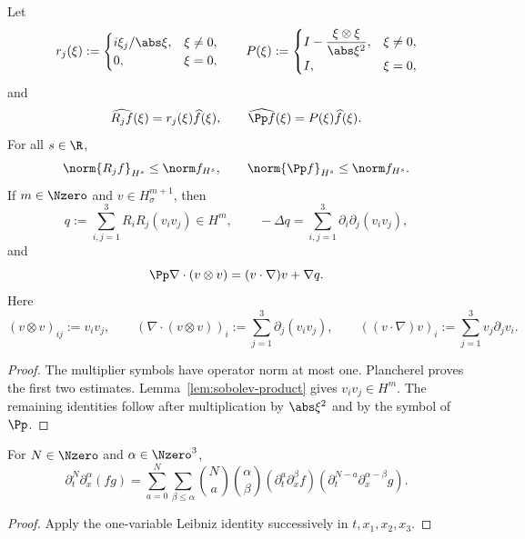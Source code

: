 \begin{lemma}
\label{lem:riesz-leray}
Let
\[
 r_j(\xi):=
 \begin{cases}
 i\xi_j/\abs\xi,&\xi\ne0,\\
 0,&\xi=0,
 \end{cases}
 \qquad
 P(\xi):=
 \begin{cases}
 I-\dfrac{\xi\otimes\xi}{\abs\xi^2},&\xi\ne0,\\
 I,&\xi=0,
 \end{cases}
\]
and
\[
 \widehat{R_jf}(\xi)=r_j(\xi)\widehat f(\xi),
 \qquad
 \widehat{\Pp f}(\xi)=P(\xi)\widehat f(\xi).
\]
For all \(s\in\R\),
\[
 \norm{R_jf}_{H^s}\le\norm f_{H^s},
 \qquad
 \norm{\Pp f}_{H^s}\le\norm f_{H^s}.
\]
If \(m\in\Nzero\) and \(v\in H^{m+1}_\sigma\), then
\[
 q:=\sum_{i,j=1}^3R_iR_j(v_iv_j)\in H^m,
 \qquad
 -\Delta q=\sum_{i,j=1}^3\partial_i\partial_j(v_iv_j),
\]
and
\[
 \Pp\nabla\cdot(v\otimes v)
 =(v\cdot\nabla)v+\nabla q.
\]
Here
\[
 (v\otimes v)_{ij}:=v_iv_j,
 \qquad
 (\nabla\cdot(v\otimes v))_i
 :=\sum_{j=1}^3\partial_j(v_iv_j),
 \qquad
 ((v\cdot\nabla)v)_i:=\sum_{j=1}^3v_j\partial_jv_i.
\]
\end{lemma}

\begin{proof}
The multiplier symbols have operator norm at most one.  Plancherel proves the
first two estimates.  Lemma~\ref{lem:sobolev-product} gives
\(v_iv_j\in H^m\).  The remaining identities follow after multiplication by
\(\abs\xi^2\) and by the symbol of \(\Pp\).
\end{proof}

\begin{lemma}
\label{lem:mixed-leibniz}
For \(N\in\Nzero\) and \(\alpha\in\Nzero^3\),
\[
 \partial_t^N\partial_x^\alpha(fg)
 =\sum_{a=0}^N\sum_{\beta\le\alpha}
 \binom Na\binom\alpha\beta
 (\partial_t^a\partial_x^\beta f)
 (\partial_t^{N-a}\partial_x^{\alpha-\beta}g).
\]
\end{lemma}

\begin{proof}
Apply the one-variable Leibniz identity successively in \(t,x_1,x_2,x_3\).
\end{proof}

